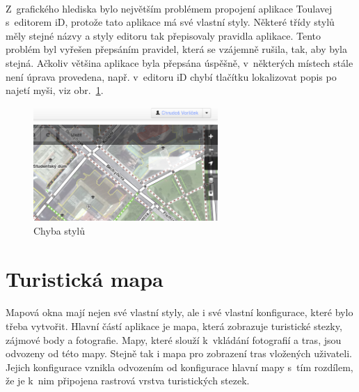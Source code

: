 \documentclass[11pt,a4paper,titlepage,oneside]{book}
\begin{document}
			\paragraph{}\label{par:grafikaId} Z~grafického hlediska bylo největším problémem propojení aplikace Toulavej s~editorem iD, protože tato aplikace má své vlastní styly. Některé třídy stylů měly stejné názvy a  styly editoru tak přepisovaly pravidla aplikace. Tento problém byl vyřešen přepsáním pravidel, která se vzájemně rušila, tak, aby byla stejná. Ačkoliv většina aplikace byla přepsána úspěšně, v~některých místech stále není úprava provedena, např. v~editoru iD chybí tlačítku lokalizovat popis po najetí myši, viz obr.~\ref{fig:error_locate}.
		\begin{figure}[!h]
			\begin{center}
				\includegraphics[width=7cm]{obrazky/toulavej/chyba_locate.png}
				\caption{Chyba stylů}
				\label{fig:error_locate}
			\end{center}
		\end{figure}	




		\section{Turistická mapa}
			\paragraph{} Mapová okna mají nejen své vlastní styly, ale i své vlastní konfigurace, které bylo třeba vytvořit. Hlavní částí aplikace je mapa, která zobrazuje turistické stezky, zájmové body a fotografie. Mapy, které slouží k~vkládání fotografií a tras, jsou odvozeny od této mapy. Stejně tak i mapa pro zobrazení tras vložených uživateli. Jejich konfigurace vznikla odvozením od konfigurace hlavní mapy s~tím rozdílem, že je k~nim připojena rastrová vrstva turistických stezek.
\end{document}

